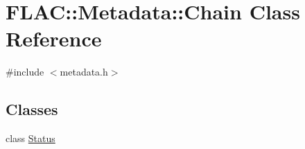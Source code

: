\hypertarget{class_f_l_a_c_1_1_metadata_1_1_chain}{}\section{F\+L\+AC\+:\+:Metadata\+:\+:Chain Class Reference}
\label{class_f_l_a_c_1_1_metadata_1_1_chain}


{\ttfamily \#include $<$metadata.\+h$>$}

\subsection*{Classes}
\begin{DoxyCompactItemize}
\item 
class \hyperlink{class_f_l_a_c_1_1_metadata_1_1_chain_1_1_status}{Status}
\end{DoxyCompactItemize}
